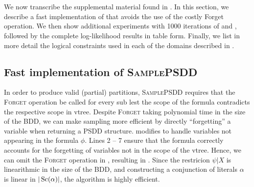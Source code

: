 \section{}
\label{sec:samplepsdd-app}

We now transcribe the supplemental material found in \citet{geh21a}. In this section, we describe a
fast implementation of  that avoids the use of the costly Forget operation. We
then show additional experiments with \num{1000} iterations of  and
, followed by the complete log-likelihood results in table form. Finally, we list
in more detail the logical constraints used in each of the domains described in
.

\subsection{Fast implementation of \textsc{SamplePSDD}}

In order to produce valid (partial) partitions, \textsc{SamplePSDD} requires that the
\textsc{Forget} operation be called for every sub lest the scope of the formula contradicts the
respective scope in vtree. Despite \textsc{Forget} taking polynomial time in the size of the BDD,
we can make sampling more efficient by directly ``forgetting''  a variable when returning a PSDD
structure.  modifies  to handle variables not
appearing in the formula $\phi$. Lines 2 -- 7 ensure that the formula correctly accounts for the
forgetting of variables not in the scope of the vtree. Hence, we can omit the \textsc{Forget}
operation in , resulting in . Since the
restricion $\psi|X$ is linearithmic in the size of the BDD, and constructing a conjunction of
literals $\alpha$ is linear in $|\operatorname*{\normalfont{Sc}}(\alpha)|$, the algorithm is highly efficient.

